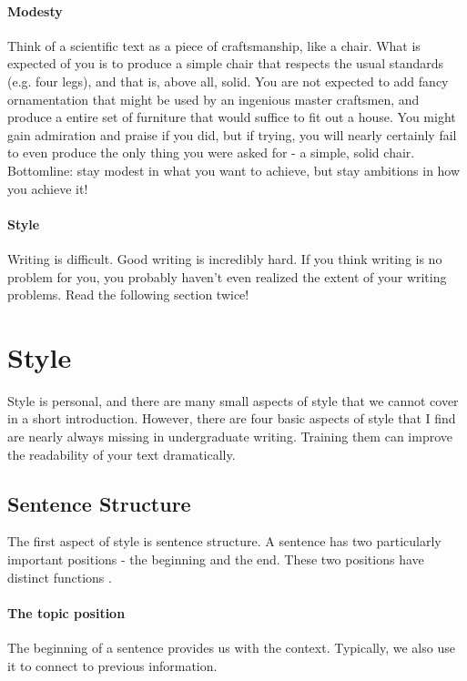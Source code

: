 \documentclass{tufte-book}
\begin{document}
\paragraph{Modesty} Think of a scientific text as a piece of craftsmanship, like a chair. What is expected of you is to produce a simple chair that respects the usual standards (e.g. four legs), and that is, above all, solid. You are not expected to add fancy ornamentation that might be used by an ingenious master craftsmen, and produce a entire set of furniture that would suffice to fit out a house. You might gain admiration and praise if you did, but if trying, you will nearly certainly fail to even produce the only thing you were asked for - a simple, solid chair. Bottomline: stay modest in what you want to achieve, but stay ambitions in how you achieve it!


\paragraph{Style} Writing is difficult. Good writing is incredibly hard. If you think writing is no problem for you, you probably haven't even realized the extent of your writing problems. Read the following section twice!


\section{Style}

Style is personal, and there are many small aspects of style that we cannot cover in a short introduction. However, there are four basic aspects of style that I find are nearly always missing in undergraduate writing. Training them can improve the readability of your text dramatically. 

\subsection{Sentence Structure}

The first aspect of style is sentence structure. A sentence has two particularly important positions - the  beginning and the end. These two positions have distinct functions \citep{Gopen-ScienceOfScientific-1990,Tischler-Scientificwritingbooklet-1978}.

\paragraph{The topic position} The beginning of a sentence provides us with the context. Typically, we also use it to connect to previous information.
\end{document}
